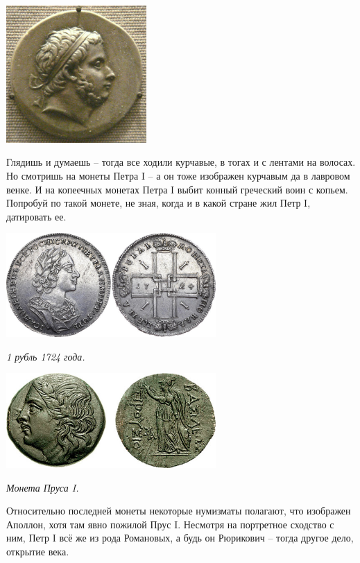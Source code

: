 \begin{center}
\includegraphics[width=0.40\textwidth]{chast-troya/kiy-prussia/Prusias_I_of_Bithynia_bearded.jpg}
\end{center}

Глядишь и думаешь – тогда все ходили курчавые, в тогах и с лентами на волосах. Но смотришь на монеты Петра I – а он тоже изображен курчавым да в лавровом венке. И на копеечных монетах Петра I выбит конный греческий воин с копьем. Попробуй по такой монете, не зная, когда и в какой стране жил Петр I, датировать ее.

\begin{center}
\includegraphics[width=0.60\textwidth]{chast-troya/kiy-prussia/s-04-286_k650.jpg}

\textit{1 рубль 1724 года.}
\end{center}

\begin{center}
\includegraphics[width=0.60\textwidth]{chast-troya/kiy-prussia/RecGen_16-4.jpg}

\textit{Монета Пруса I.}
\end{center}

Относительно последней монеты некоторые нумизматы полагают, что изображен Аполлон, хотя там явно пожилой Прус I. Несмотря на портретное сходство с ним, Петр I всё же из рода Романовых, а будь он Рюрикович – тогда другое дело, открытие века.

